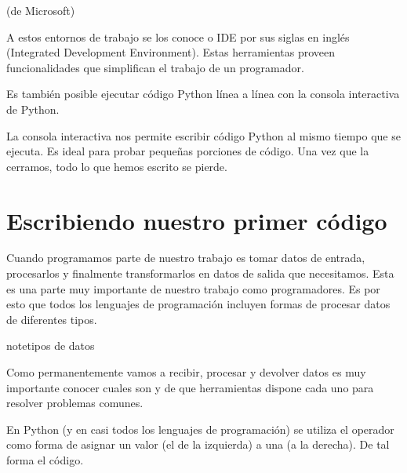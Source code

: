 \documentclass[a5paper,9pt,spanish]{sphinxmanual}
\begin{document}
\noindent{}

\sphinxAtStartPar
{}%
\begin{footnote}[2]\sphinxAtStartFootnote
{}
%
\end{footnote} (de Microsoft)

\noindent{}

\sphinxAtStartPar
A estos entornos de trabajo se los conoce  o
IDE por sus siglas en inglés (Integrated Development Environment).
Estas herramientas proveen funcionalidades que simplifican el trabajo de un programador.

\sphinxAtStartPar
Es también posible ejecutar código Python línea a línea con la consola interactiva de Python.

\noindent{}

\noindent{}

\sphinxAtStartPar
La consola interactiva nos permite escribir código Python al mismo tiempo que se ejecuta.
Es ideal para probar pequeñas porciones de código. Una vez que la cerramos, todo lo que
hemos escrito se pierde.

\sphinxstepscope


\chapter{Escribiendo nuestro primer código}
\label{\detokenize{interactivo:escribiendo-nuestro-primer-codigo}}\label{\detokenize{interactivo::doc}}
\sphinxAtStartPar
Cuando programamos parte de nuestro trabajo es tomar datos de entrada,
procesarlos y finalmente transformarlos en datos de salida que necesitamos.
Esta es una parte muy importante de nuestro trabajo como programadores. Es por
esto que todos los lenguajes de programación incluyen formas de procesar datos
de diferentes tipos.

\begin{sphinxadmonition}{note}{tipos de datos}

\sphinxAtStartPar
Como permanentemente vamos a recibir, procesar y devolver datos es muy importante
conocer cuales son y de que herramientas dispone cada uno para resolver problemas
comunes.
\end{sphinxadmonition}

\sphinxAtStartPar
En Python (y en casi todos los lenguajes de programación) se utiliza el
operador \sphinxcode{\sphinxupquote{=}} como forma de asignar un valor (el de la izquierda) a una 
(a la derecha). De tal forma el código.
\end{document}

